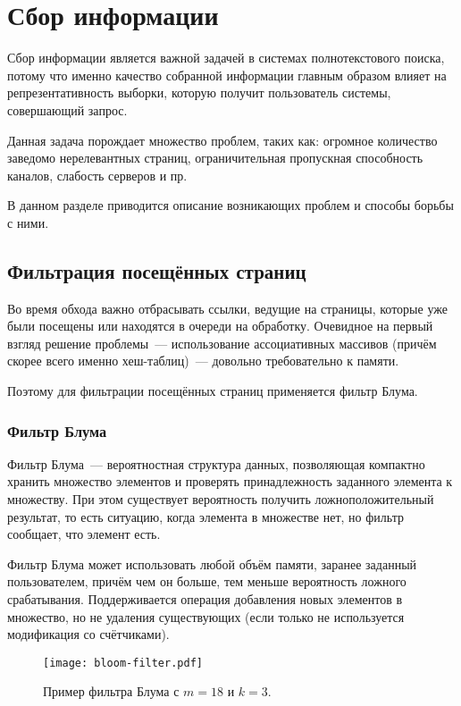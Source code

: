 \section{Сбор информации}
Сбор информации является важной задачей в системах полнотекстового поиска, потому что именно качество собранной информации главным образом влияет на репрезентативность выборки, которую получит пользователь системы, совершающий запрос.

Данная задача порождает множество проблем, таких как: огромное количество заведомо нерелевантных страниц, ограничительная пропускная способность каналов, слабость серверов и пр.

В данном разделе приводится описание возникающих проблем и способы борьбы с ними.


\subsection{Фильтрация посещённых страниц}
Во время обхода важно отбрасывать ссылки, ведущие на страницы, которые уже были посещены или находятся в очереди на обработку. Очевидное на первый взгляд решение проблемы~--- использование ассоциативных массивов (причём скорее всего именно хеш-таблиц)~--- довольно требовательно к памяти.

Поэтому для фильтрации посещённых страниц применяется фильтр Блума.


\subsubsection{Фильтр Блума}
Фильтр Блума~--- вероятностная структура данных, позволяющая компактно хранить множество элементов и проверять принадлежность заданного элемента к множеству. При этом существует вероятность получить ложноположительный результат, то есть ситуацию, когда элемента в множестве нет, но фильтр сообщает, что элемент есть.

Фильтр Блума может использовать любой объём памяти, заранее заданный пользователем, причём чем он больше, тем меньше вероятность ложного срабатывания. Поддерживается операция добавления новых элементов в множество, но не удаления существующих (если только не используется модификация со счётчиками).

\begin{figure}[h]
  \centering
  \texttt{[image: bloom-filter.pdf]}
  \caption{Пример фильтра Блума с $m=18$ и $k=3$.}
\end{figure}

